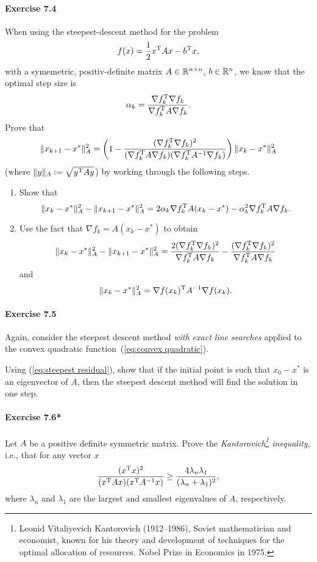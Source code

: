 \paragraph{Exercise 7.4} %
When using the steepest-descent method for the problem
\begin{equation}\label{eq:convex quadratic}
   f(x) = \frac{1}{2} x^{\text{\upshape T}} A x - b^{\text{\upshape T}} x,
\end{equation}
with a symemetric, positiv-definite matrix $A\in\mathbb{R}^{n\times n}$, $b\in\mathbb{R}^n$,
we know that the optimal step size is
\[
  \alpha_k = \frac{\nabla f_k^{\text{\upshape T}} \nabla f_k}{\nabla f_k^{\text{\upshape T}} A \nabla f_k}.
\]
Prove that
\begin{equation}\label{eq:steepest residual}
  \|x_{k+1} - x^*\|_A^2
  = \left(1 - \frac{(\nabla f_k^{\text{\upshape T}}\nabla f_k)^2}{(\nabla f_k^{\text{\upshape T}} A\nabla f_k)(\nabla f_k^{\text{\upshape T}} A^{-1} \nabla f_k)}\right)\|x_{k} - x^*\|_A^2
\end{equation}
(where $\|y\|_A\mathrel{\mathop:}= \sqrt{y^{\text{\upshape T}} Ay}$)
by working through the following steps.
\begin{enumerate}
  \item Show that
\[
  \|x_k - x^*\|_A^2 - \|x_{k+1} - x^*\|_A^2 = 2\alpha_k\nabla f_k^{\text{\upshape T}} A(x_k-x^*) - \alpha_k^2 \nabla f_k^{\text{\upshape T}} A \nabla f_k.
\]
  \item Use the fact that $\nabla f_k = A(x_k - x^*)$ to obtain
    \[
      \|x_k-x^*\|_A^2 - \|x_{k+1}-x^*\|_A^2
      = \frac{2(\nabla f_k^{\text{\upshape T}} \nabla f_k)^2}{\nabla f_k^{\text{\upshape T}} A \nabla f_k} - \frac{(\nabla f_k^{\text{\upshape T}} \nabla f_k)^2}{\nabla f_k^{\text{\upshape T}} A \nabla f_k}
    \]
    and
    \[
      \|x_k-x^*\|_A^2 = \nabla f(x_k)^{\text{\upshape T}} A^{-1} \nabla f(x_k).
    \]
\end{enumerate}


\paragraph{Exercise 7.5} %
Again, consider the steepest descent method \emph{with exact line searches}
applied to the convex quadratic function~(\ref{eq:convex quadratic}).

Using (\ref{eq:steepest residual}), show that if the initial point is such
that $x_0 - x^*$ is an eigenvector of $A$, then the steepest
descent method will find the solution in one step.

\paragraph{Exercise 7.6*}
Let $A$ be a positive definite symmetric matrix. Prove the
\emph{Kantorovich\footnote{Leonid Vitaliyevich Kantorovich (1912--1986),
    Soviet mathematician and economist, known for his theory and development
    of techniques for the optimal allocation of resources. Nobel Prize in
    Economics in 1975.} inequality}, i.e., that for any vector $x$
\[
  \frac{(x^{\text{\upshape T}} x)^2}{(x^{\text{\upshape T}} A x)(x^{\text{\upshape T}} A^{-1}x)}
  \ge \frac{4\lambda_n\lambda_1}{(\lambda_n + \lambda_1)^2},
\]
where $\lambda_n$ and $\lambda_1$ are the largest and smallest eigenvalues of
$A$, respectively.

